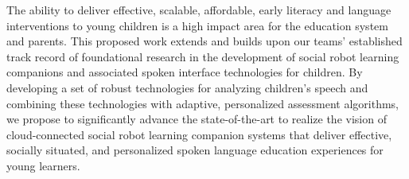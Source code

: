 The ability to deliver effective, scalable, affordable, early literacy and language interventions to young children is a high impact area for the education system and parents. This proposed work extends and builds upon our teams' established track record of foundational research in the development of social robot learning companions and associated spoken interface technologies for children. By developing a set of robust technologies for analyzing children's speech and combining these technologies with adaptive, personalized assessment algorithms, we propose to significantly advance the state-of-the-art to realize the vision of cloud-connected social robot learning companion systems that deliver effective, socially situated, and personalized spoken language education experiences for young learners.\\



